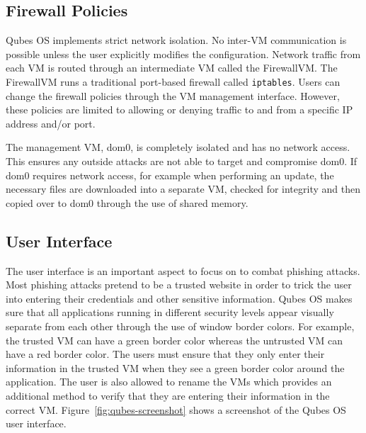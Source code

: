 \subsection{Firewall Policies}

Qubes OS implements strict network isolation. No inter-VM communication is possible unless the user explicitly modifies the configuration. Network traffic from each VM is routed through an intermediate VM called the FirewallVM. The FirewallVM runs a traditional port-based firewall called {\tt iptables}. Users can change the firewall policies through the VM management interface. However, these policies are limited to allowing or denying traffic to and from a specific IP address and/or port.

The management VM, dom0, is completely isolated and has no network access. This ensures any outside attacks are not able to target and compromise dom0. If dom0 requires network access, for example when performing an update, the necessary files are downloaded into a separate VM, checked for integrity and then copied over to dom0 through the use of shared memory.

\subsection{User Interface}

The user interface is an important aspect to focus on to combat phishing attacks. Most phishing attacks pretend to be a trusted website in order to trick the user into entering their credentials and other sensitive information. Qubes OS makes sure that all applications running in different security levels appear visually separate from each other through the use of window border colors. For example, the trusted VM can have a green border color whereas the untrusted VM can have a red border color. The users must ensure that they only enter their information in the trusted VM when they see a green border color around the application. The user is also allowed to rename the VMs which provides an additional method to verify that they are entering their information in the correct VM. Figure~\ref{fig:qubes-screenshot} shows a screenshot of the Qubes OS user interface.

